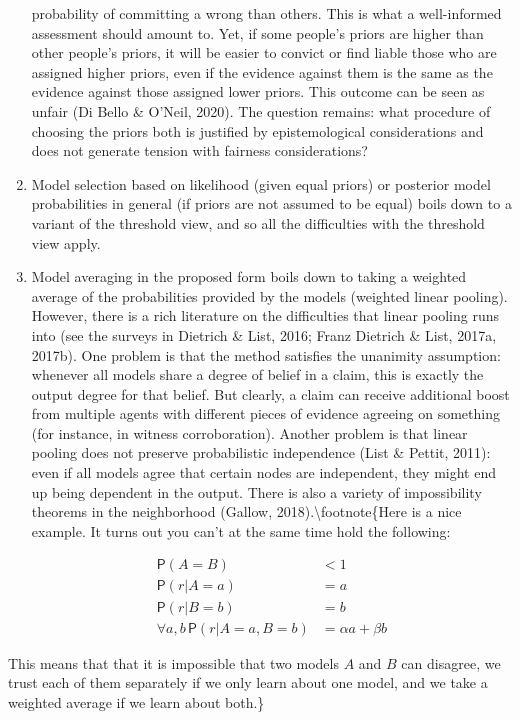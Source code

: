 \documentclass[11pt,dvipsnames,enabledeprecatedfontcommands]{scrartcl}
\newcommand{\pr}[1]{\mathsf{P}(#1)}
\begin{document}
\begin{enumerate}
  probability of committing a wrong than others. This is what a
  well-informed assessment should amount to. Yet, if some people's
  priors are higher than other people's priors, it will be easier to
  convict or find liable those who are assigned higher priors, even if
  the evidence against them is the same as the evidence against those
  assigned lower priors. This outcome can be seen as unfair (Di Bello \&
  O'Neil, 2020). The question remains: what procedure of choosing the
  priors both is justified by epistemological considerations and does
  not generate tension with fairness considerations?
\item
  Model selection based on likelihood (given equal priors) or posterior
  model probabilities in general (if priors are not assumed to be equal)
  boils down to a variant of the threshold view, and so all the
  difficulties with the threshold view apply.
\item
  Model averaging in the proposed form boils down to taking a weighted
  average of the probabilities provided by the models (weighted linear
  pooling). However, there is a rich literature on the difficulties that
  linear pooling runs into (see the surveys in Dietrich \& List, 2016;
  Franz Dietrich \& List, 2017a, 2017b). One problem is that the method
  satisfies the unanimity assumption: whenever all models share a degree
  of belief in a claim, this is exactly the output degree for that
  belief. But clearly, a claim can receive additional boost from
  multiple agents with different pieces of evidence agreeing on
  something (for instance, in witness corroboration). Another problem is
  that linear pooling does not preserve probabilistic independence (List
  \& Pettit, 2011): even if all models agree that certain nodes are
  independent, they might end up being dependent in the output. There is
  also a variety of impossibility theorems in the neighborhood (Gallow,
  2018).\textbackslash{}footnote\{Here is a nice example. It turns out
  you can't at the same time hold the following:

  \begin{align}
  \pr{A=B} & <1\\
  \pr{r\vert A=a} & = a \\
  \pr{r\vert B=b} & = b \\
  \forall a,b \, \pr{r \vert A =a, B = b} & =  \alpha a + \beta b
  \end{align}
\end{enumerate}

\noindent This means that that it is impossible that two models \(A\)
and \(B\) can disagree, we trust each of them separately if we only
learn about one model, and we take a weighted average if we learn about
both.\}
\end{document}
